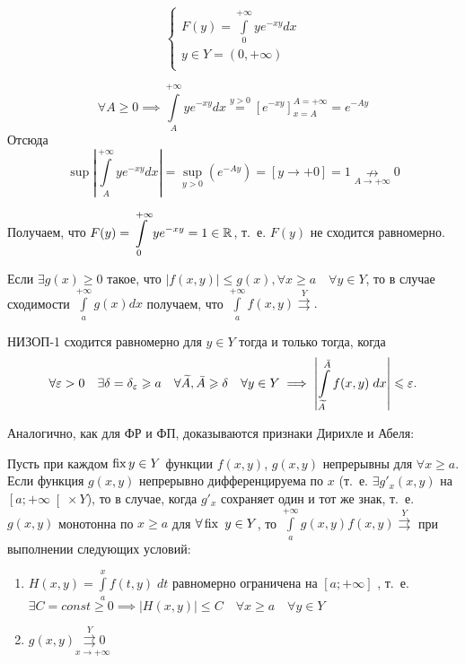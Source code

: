 \documentclass[../../main.tex]{subfiles}
\begin{document}
\begin{exmp}
\[ \left\{\begin{array}{l}
		F(y)=\int\limits_0^{+\infty}ye^{-xy}dx\\
		y \in Y = (0,+\infty)\\
		\end{array}
		\right. \]

\[\forall A \ge 0 \implies \int\limits_A^{+\infty}ye^{-xy}dx \overset{y > 0} = 
\left[e^{-xy} \right]_{x = A}^{A = +\infty} = e^{-Ay}\]
Отсюда
\[\sup\left| \int\limits_A^{+\infty}ye^{-xy}dx \right|=\underset{y > 0}\sup  
\left( e^{-Ay}\right) = \left[y \to +0\right] = 1 \underset{A \to 
+\infty}\nrightarrow 0\]

Получаем, что $F(y) = \displaystyle\int\limits_0^{+\infty}ye^{-xy} = 1 \in 
\mathbb{R}$, т.~е. $F(y)$ не сходится 
равномерно.
\end{exmp}

\begin{thm}
Если $\exists g(x) \ge 0$ такое, что $\left| f(x,y) \right| \le g(x), \forall 
x \ge a\quad
\forall y \in Y $, то в случае сходимости $\int\limits_a^{+\infty}g(x)dx$ 
получаем, что 
$\int\limits_a^{+\infty}f(x,y) \overset{Y}\rightrightarrows.$ 
\end{thm}

\begin{crl*}
НИЗОП-1 сходится равномерно для $ y \in Y$ тогда и только тогда, 
когда\begin{equation}\label{lec10:11} \forall \varepsilon > 0\quad \exists \delta = 
\delta_\varepsilon \geqslant a\quad \forall \widetilde{A}, \bar{A} \geqslant \delta \quad \forall 
y 
\in Y \implies \left| \int\limits_{\widetilde{A}}^{\bar{A}}f(x,y)\;dx \right| 
\leqslant
\varepsilon. \end{equation}
\end{crl*}

Аналогично, как для ФР и ФП, доказываются признаки Дирихле и Абеля:

\begin{thm}

Пусть при каждом $\operatorname{fix} y \in Y$ функции $f(x,y)$, $g(x,y)$ непрерывны 
для $\forall x \ge a$. Если функция $g(x,y)$ непрерывно дифференцируема по $x$
(т.~е. $\exists g'_x(x,y)$ на $\left[a;+\infty\right[ \times Y $), то в 
случае, когда $g'_x$ сохраняет один и тот же знак, т.~е. $g(x,y)$ 
монотонна по $x \ge a$ для $\forall \operatorname{fix} \ y \in Y$, то 
$\int\limits_a^{+\infty} g(x,y)f(x,y) \overset{Y}{\rightrightarrows}$ при 
выполнении следующих условий:
\begin{enumerate}
\item $H(x,y) = \int\limits_a^x f(t,y)\;dt$ равномерно ограничена на 
$[a;+\infty]$ 
, т.~е. $\exists C = const \ge 0 \implies \left|H(x,y)\right| \le C \quad
\forall x \ge a\quad \forall y \in Y$
\item $g(x,y)\underset{x \to +\infty}{\overset{Y}{\rightrightarrows} 0}$
\end{enumerate}
\end{thm}
\end{document}
